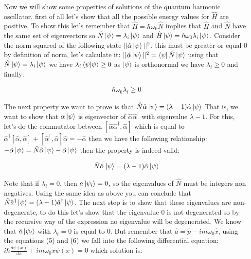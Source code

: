 \documentclass[
  journal=largetwo,
  year=2023,
]{cup-journal}
\begin{document}
Now we will show some properties of solutions of the quantum harmonic oscillator, first of all let's show that all the possible energy values for \(\hat{H}\) are positive. To show this let's remember that \(\hat{H} = \hbar\omega_0\hat{N}\) implies that \(\hat{H}\) and \(\hat{N}\) have the same set of eigenvectors so \(\hat{N}\ket{\psi} = \lambda_i\ket{\psi}\) and \(\hat{H}\ket{\psi} = \hbar\omega_0\lambda_i\ket{\psi}\). Consider the norm squared of the following state \(||\hat{\alpha}\ket{\psi}||^2\), this must be greater or equal 0 by definition of norm, let's calculate it: \(||\hat{\alpha}\ket{\psi}||^2 = \bra{\psi}\hat{N}\ket{\psi}\) using that \(\hat{N}\ket{\psi} = \lambda_i\ket{\psi}\) we have \(\lambda_i\bra{\psi}\ket{\psi} \geq 0\) as \(\ket{\psi}\) is orthonormal we have \(\lambda_i \geq 0\) and finally:

\begin{equation}
  \begin{aligned}\label{eq:13}
    \hbar\omega_0\lambda_i \geq 0
  \end{aligned}
\end{equation}


The next property we want to prove is that \(\hat{N}\hat{\alpha}\ket{\psi} = (\lambda-1)\hat{\alpha}\ket{\psi}\) That is, we want to show that \(\alpha\ket{\psi}\) is eigenvector of \(\hat{\alpha}\hat{\alpha}^{\dag}\) with eigenvalue \(\lambda-1\). For this, let's do the commutator between \([\hat{\alpha}\hat{\alpha}^{\dag}, \hat{\alpha}]\) which is equal to \(\hat{\alpha}^{\dag}[\hat{\alpha}, \hat{\alpha}] + [\hat{\alpha}^{\dag}, \hat{\alpha}]\hat{\alpha} = -\hat{\alpha}\) then we have the following relationship: \(-\hat{\alpha}\ket{\psi} = \hat{N}\hat{\alpha}\ket{\psi} - \hat{\alpha}\ket{\psi} \) then the property is indeed valid:

\begin{equation}
  \begin{aligned}\label{eq:14.1}
    \hat{N}\hat{\alpha}\ket{\psi} = (\lambda-1)\hat{\alpha}\ket{\psi}
  \end{aligned}
\end{equation}


Note that if \(\lambda_i = 0\), then \(a\ket{\psi_i} = 0\), so the eigenvalues of \(\hat{N}\) must be integers non negatives. Using the same idea as above you can conclude that \(\hat{N}\hat{a}^{\dag}\ket{\psi} = (\lambda+1)\hat{a}^{\dag}\ket{\psi}\). The next step is to show that these eigenvalues are non-degenerate, to do this let's show that the eigenvalue 0 is not degenerated so by the recursive way of the expression no eigenvalue will be degenerated. We know that \(\hat{a}\ket{\psi_i}\) with \(\lambda_i = 0\) is equal to \(0\). But remember that \(\hat{a} = \hat{p} - im\omega_0\hat{x}\), using the equations (5) and (6) we fall into the following differential equation: \(i\hbar\frac{d\psi(x)}{dx} + im\omega_0 x\psi(x) = 0\) which solution is:
\end{document}
